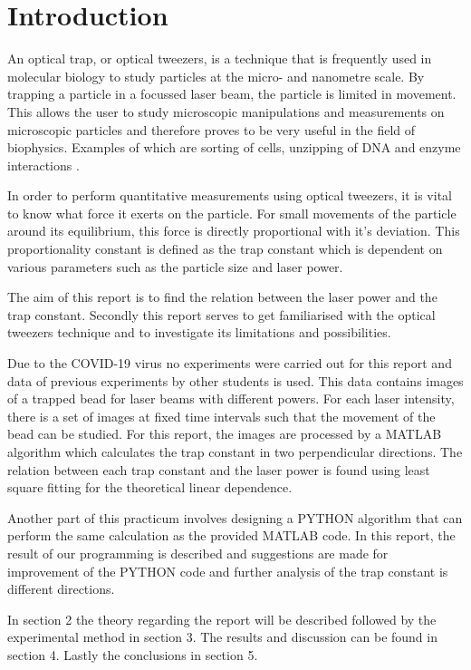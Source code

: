 \section{Introduction}

An optical trap, or optical tweezers, is a technique that is frequently used in molecular biology to study particles at the micro- and nanometre scale. By trapping a particle in a focussed laser beam, the particle is limited in movement. This allows the user to study microscopic manipulations and measurements on microscopic particles and therefore proves to be very useful in the field of biophysics. Examples of which are sorting of cells, unzipping of DNA and enzyme interactions \cite{shaevitz}\cite{velthuis}.

In order to perform quantitative measurements using optical tweezers, it is vital to know what force it exerts on the particle. For small movements of the particle around its equilibrium, this force is directly proportional with it's deviation. This proportionality constant is defined as the trap constant which is dependent on various parameters such as the particle size and laser power.

The aim of this report is to find the relation between the laser power and the trap constant. Secondly this report serves to get familiarised with the optical tweezers technique and to investigate its limitations and possibilities.

Due to the COVID-19 virus no experiments were carried out for this report and data of previous experiments by other students is used. This data contains images of a trapped bead for laser beams with different powers. For each laser intensity, there is a set of images at fixed time intervals such that the movement of the bead can be studied. For this report, the images are processed by a MATLAB algorithm which calculates the trap constant in two perpendicular directions. The relation between each trap constant and the laser power is found using least square fitting for the theoretical linear dependence.
 
Another part of this practicum involves designing a PYTHON algorithm that can perform the same calculation as the provided MATLAB code. In this report, the result of our programming is described and suggestions are made for improvement of the PYTHON code and further analysis of the trap constant is different directions.

In section 2 the theory regarding the report will be described followed by the experimental method in section 3. The results and discussion can be found in section 4. Lastly the conclusions in section 5.








